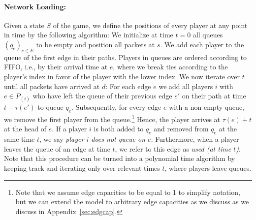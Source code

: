 \paragraph{Network Loading:}
Given a state $S$ of the game, we define the positions of every player at any point in time by the following algorithm: 
We initialize at time $t=0$ all queues $(q_e)_{e\in E}$ to be empty and position all packets at $s$. We add each player to the queue of the first edge in their paths. Players in queues are ordered according to FIFO, i.e., by their arrival time at $e$, where we break ties according to the player's index in favor of the player with the lower index.
We now iterate over $t$ until all packets have arrived at $d$:
For each edge $e$ we add all players $i$ with $e \in P_{(i)}$ who have left the queue of their previous edge $e'$ on their path at time $t-\tau(e')$ to queue $q_e$. Subsequently, for every edge $e$ with a non-empty queue, we remove the first player from the queue.\footnote{Note that we assume edge capacities to be equal to 1 to simplify notation, but we can extend the model to arbitrary edge capacities as we discuss as we discuss in Appendix~\ref{sec:edgcap}.} Hence, the player arrives at $\tau(e) + t$ at the head of $e$. If a player $i$ is both added to $q_e$ and removed from $q_e$ at the same time $t$, we say \emph{player $i$ does not queue on $e$}. Furthermore, when a player leaves the queue of an edge at time $t$, we refer to this edge as \emph{used (at time $t$)}. Note that this procedure can be turned into a polynomial time algorithm by keeping track and iterating only over relevant times $t$, where players leave queues.


